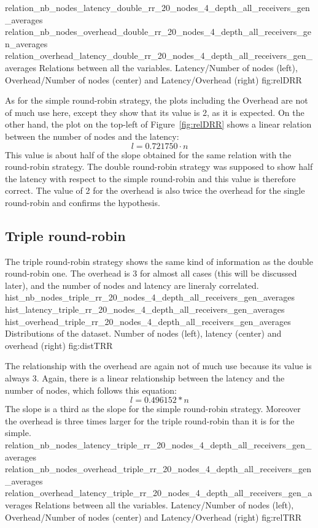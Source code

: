 \triplefigure
    {relation_nb_nodes_latency_double_rr_20_nodes_4_depth_all_receivers_gen_averages}
    {relation_nb_nodes_overhead_double_rr_20_nodes_4_depth_all_receivers_gen_averages}
    {relation_overhead_latency_double_rr_20_nodes_4_depth_all_receivers_gen_averages}
    {Relations between all the variables. Latency/Number of nodes (left),
    Overhead/Number of nodes (center) and Latency/Overhead (right)}
    {fig:relDRR}

As for the simple round-robin strategy, the plots including the Overhead are not
of much use here, except they show that its value is 2, as it is expected. 
On the other hand, the plot on the top-left of Figure~\ref{fig:relDRR} shows a
linear relation between the number of nodes and the latency: 
\[l = 0.721750 \cdot n\]
This value is about half of the slope obtained for the same relation with the
round-robin strategy. The double round-robin strategy was supposed to show half
the latency with respect to the simple round-robin and this value is therefore
correct. The value of 2 for the overhead is also twice the overhead for the
single round-robin and confirms the hypothesis.
    

\subsection{Triple round-robin}
The triple round-robin strategy shows  the same kind of information as the
double round-robin one. The overhead is 3 for almost all cases (this will be
discussed later), and the number of nodes and latency are lineraly correlated.
\triplefigure
    {hist_nb_nodes_triple_rr_20_nodes_4_depth_all_receivers_gen_averages}
    {hist_latency_triple_rr_20_nodes_4_depth_all_receivers_gen_averages}
    {hist_overhead_triple_rr_20_nodes_4_depth_all_receivers_gen_averages}
    {Distributions of the dataset. Number of nodes (left), latency (center)
    and overhead (right)}
    {fig:distTRR}

The relationship with the overhead are again not of much use because its value
is always 3. Again, there is a linear relationship between the latency and the
number of nodes, which follows this equation:
    \[l = 0.496152 * n\]
The slope is a third as the slope for the simple round-robin strategy. Moreover
the overhead is three times larger for the triple round-robin than it is for the
simple.
\triplefigure
    {relation_nb_nodes_latency_triple_rr_20_nodes_4_depth_all_receivers_gen_averages}
    {relation_nb_nodes_overhead_triple_rr_20_nodes_4_depth_all_receivers_gen_averages}
    {relation_overhead_latency_triple_rr_20_nodes_4_depth_all_receivers_gen_averages}
    {Relations between all the variables. Latency/Number of nodes (left),
    Overhead/Number of nodes (center) and Latency/Overhead (right)}
    {fig:relTRR}

